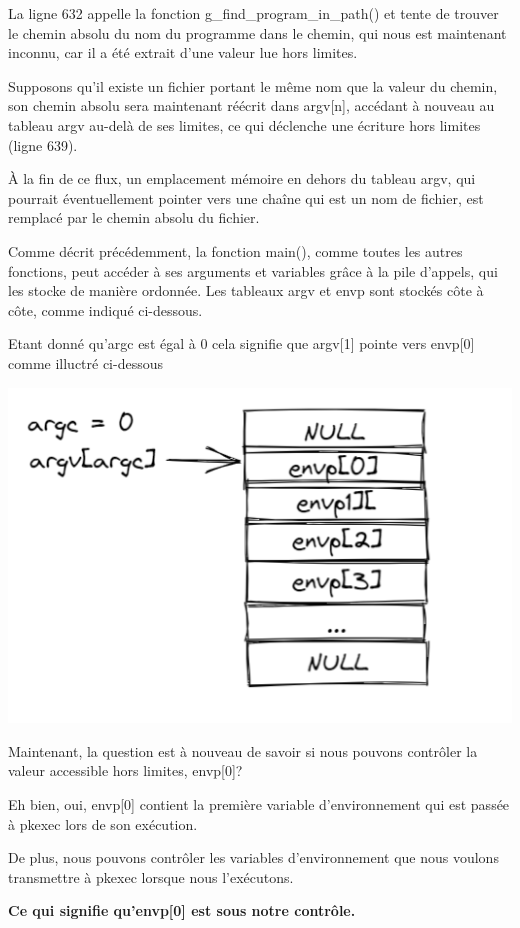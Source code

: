\documentclass[12pt,a4paper]{article}
\begin{document}
\begin{flushleft}
                \item La ligne 632 appelle la fonction g\_find\_program\_in\_path() et tente de trouver le chemin absolu du nom du programme dans le chemin, qui nous est maintenant inconnu, car il a été extrait d’une valeur lue hors limites. 
                \item Supposons qu’il existe un fichier portant le même nom que la valeur du chemin, son chemin absolu sera maintenant réécrit dans argv[n], accédant à nouveau au tableau argv au-delà de ses limites, ce qui déclenche une écriture hors limites (ligne 639).
                \item À la fin de ce flux, un emplacement mémoire en dehors du tableau argv, qui pourrait éventuellement pointer vers une chaîne qui est un nom de fichier, est remplacé par le chemin absolu du fichier.

                \item Comme décrit précédemment, la fonction main(), comme toutes les autres fonctions, peut accéder à ses arguments et variables grâce à la pile d’appels, qui les stocke de manière ordonnée. Les tableaux argv et envp sont stockés côte à côte, comme indiqué ci-dessous.
                \item  Etant donné qu'argc est égal à 0 cela signifie que argv[1] pointe vers envp[0] comme illuctré ci-dessous
                \begin{center}
                    \includegraphics[scale=0.7]{ecriture environnement.png}
                \end{center}
                \item Maintenant, la question est à nouveau de savoir si nous pouvons contrôler la valeur accessible hors limites, envp[0]? 
                \item Eh bien, oui, envp[0] contient la première variable d’environnement qui est passée à pkexec lors de son exécution. 
                \item De plus, nous pouvons contrôler les variables d’environnement que nous voulons transmettre à pkexec lorsque nous l’exécutons. 
                \item \textbf{Ce qui signifie qu'envp[0] est sous notre contrôle.}
                

\end{flushleft}
\end{document}
